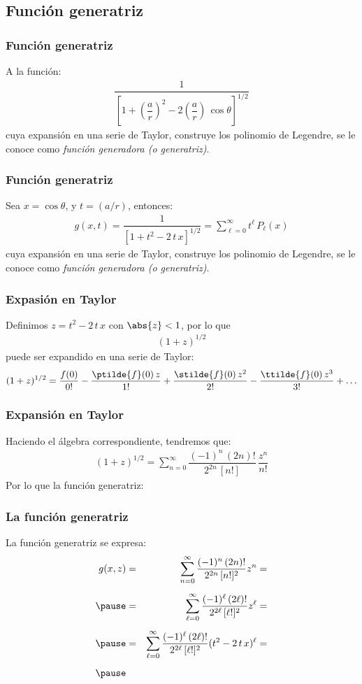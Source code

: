 \subsection{Función generatriz}
\begin{frame}
\frametitle{Función generatriz}
A la función:
\begin{align*}
\dfrac{1}{\left[ 1 + \left( \dfrac{a}{r} \right)^{2} - 2 \left( \dfrac{a}{r} \right) \, \cos \theta \right]^{1/2}}
\end{align*}
cuya expansión en una serie de Taylor, construye los polinomio de Legendre, se le conoce como \emph{función generadora (o generatriz)}.
\end{frame}
\begin{frame}
\frametitle{Función generatriz}
Sea $x = \cos \theta$, y $t = (a/r)$, entonces:
\begin{align*}
g(x, t) = \dfrac{1}{\left[ 1 + t^{2} - 2 \, t \, x \right]^{1/2} } = \sum_{\ell=0}^{\infty} t^{\ell} \, P_{\ell} (x)
\end{align*}
cuya expansión en una serie de Taylor, construye los polinomio de Legendre, se le conoce como \emph{función generadora (o generatriz)}.
\end{frame}
\begin{frame}
\frametitle{Expasión en Taylor}
Definimos $z = t^{2} - 2 \, t \, x$ con $\abs{z} < 1$, por lo que
\begin{align*}
(1 + z)^{1/2}
\end{align*}
puede ser expandido en una serie de Taylor: 
\pause
\fontsize{12}{12}\selectfont
\begin{align*}
(1 + z)^{1/2} = \dfrac{f(0)}{0!} - \dfrac{\ptilde{f}(0) \, z}{1!} + \dfrac{\stilde{f}(0) \, z^{2}}{2!} - \dfrac{\ttilde{f}(0) \, z^{3}}{3!} + \ldots
\end{align*}
\end{frame}
\begin{frame}
\frametitle{Expansión en Taylor}
Haciendo el álgebra correspondiente, tendremos que:
\begin{align*}
(1 + z)^{1/2} = \sum_{n=0}^{\infty} \dfrac{(-1)^{n} \, (2 n)!}{2^{2 n} \, [n!]} \, \dfrac{z^{n}}{n!}
\end{align*}
\pause
Por lo que la función generatriz:
\end{frame}
\begin{frame}
\frametitle{La función generatriz}
La función generatriz se expresa:
\begin{eqnarray*}
g(x, z) &=& \sum_{n=0}^{\infty} \dfrac{(-1)^{n} \, (2 n)!}{2^{2 n} \, [n!]^{2}} z^{n} = \\[0.5em] \pause
&=& \sum_{\ell=0}^{\infty} \dfrac{(-1)^{\ell} \, (2 \ell)!}{2^{2 \ell} \, [\ell!]^{2}} z^{\ell} = \\[0.5em] \pause
&=& \sum_{\ell=0}^{\infty} \dfrac{(-1)^{\ell} \, (2 \ell)!}{2^{2 \ell} \, [\ell!]^{2}} (t^{2} - 2 \, t \, x)^{\ell} = \\[0.5em] \pause
\end{eqnarray*}
\end{frame}
